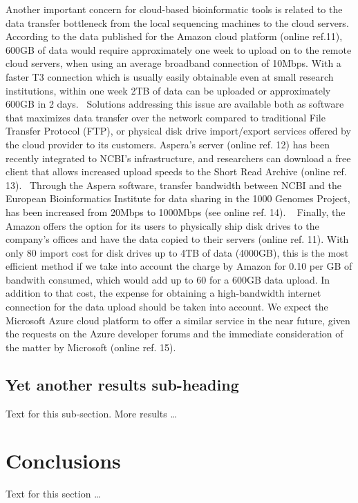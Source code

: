 \documentclass[10pt]{bmc_article}
\newenvironment{bmcformat}{\begin{raggedright}\baselineskip20pt\sloppy\setboolean{publ}{false}}{\end{raggedright}\baselineskip20pt\sloppy}
\begin{document}
\begin{bmcformat}
      Another important concern for cloud-based bioinformatic tools is related to the data
      transfer bottleneck from the local sequencing machines to the cloud servers. According to
      the data published for the Amazon cloud platform (online ref.11), 600GB of data would
      require approximately one week to upload on to the remote cloud servers, when using an
      average broadband connection of 10Mbps. With a faster T3 connection which is usually
      easily obtainable even at small research institutions, within one week 2TB of data can be
      uploaded or approximately 600GB in 2 days.  Solutions addressing this issue are available
      both as software that maximizes data transfer over the network compared to traditional
      File Transfer Protocol (FTP), or physical disk drive import/export services offered by the
      cloud provider to its customers. Aspera's server (online ref. 12) has been recently
      integrated to NCBI's infrastructure, and researchers can download a free client that
      allows increased upload speeds to the Short Read Archive (online ref. 13).  Through the
      Aspera software, transfer bandwidth between NCBI and the European Bioinformatics Institute
      for data sharing in the 1000 Genomes Project, has been increased from 20Mbps to 1000Mbps
      (see online ref. 14).   Finally, the Amazon offers the option for its users to physically
      ship disk drives to the company's offices and have the data copied to their servers
      (online ref. 11). With only 80 import cost for disk drives up to 4TB of data (4000GB),
      this is the most efficient method if we take into account the charge by Amazon for 0.10
      per GB of bandwith consumed, which would add up to 60 for a 600GB data upload. In
      addition to that cost, the expense for obtaining a high-bandwidth internet connection for
      the data upload should be taken into account. We expect the Microsoft Azure cloud platform
      to offer a similar service in the near future, given the requests on the Azure developer
      forums and the immediate consideration of the matter by Microsoft (online ref. 15).
  
  \subsection*{Yet another results sub-heading}
    Text for this sub-section.  More results \ldots


\section*{Conclusions}
  Text for this section \ldots



\end{bmcformat}
\end{document}
